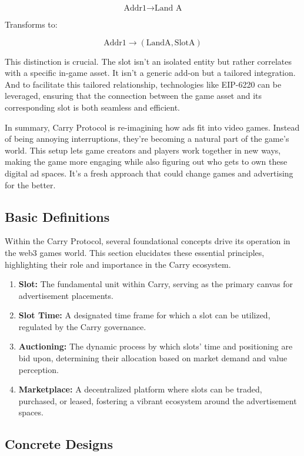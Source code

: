 \[\text{Addr1} \rightarrow \text{Land A}\]

Transforms to:

\[\text{Addr1} \rightarrow (\text{LandA}, \text{SlotA})\]

This distinction is crucial. The slot isn't an isolated entity but rather correlates with a specific in-game asset. It isn't a generic add-on but a tailored integration. And to facilitate this tailored relationship, technologies like EIP-6220 can be leveraged, ensuring that the connection between the game asset and its corresponding slot is both seamless and efficient.

In summary, Carry Protocol is re-imagining how ads fit into video games. Instead of being annoying interruptions, they're becoming a natural part of the game's world. This setup lets game creators and players work together in new ways, making the game more engaging while also figuring out who gets to own these digital ad spaces. It's a fresh approach that could change games and advertising for the better.

\subsection{Basic Definitions}
Within the Carry Protocol, several foundational concepts drive its operation in the web3 games world. This section elucidates these essential principles, highlighting their role and importance in the Carry ecosystem.
\begin{enumerate}
    \item \textbf{Slot:} The fundamental unit within Carry, serving as the primary canvas for advertisement placements.
    \item \textbf{Slot Time:} A designated time frame for which a slot can be utilized, regulated by the Carry governance.
    \item \textbf{Auctioning:} The dynamic process by which slots' time and positioning are bid upon, determining their allocation based on market demand and value perception.
    \item \textbf{Marketplace:} A decentralized platform where slots can be traded, purchased, or leased, fostering a vibrant ecosystem around the advertisement spaces.
\end{enumerate}

\subsection{Concrete Designs}

